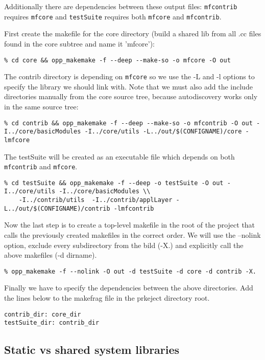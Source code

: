 Additionally there are dependencies between these output files: \texttt{mfcontrib}
requires \texttt{mfcore} and \texttt{testSuite} requires both \texttt{mfcore}
and \texttt{mfcontrib}.

First create the makefile for the core directory (build a shared lib from all .cc files
found in the core subtree and name it 'mfcore'):

\begin{verbatim}
% cd core && opp_makemake -f --deep --make-so -o mfcore -O out
\end{verbatim}

The contrib directory is depending on \texttt{mfcore} so we use the -L and -l options
to specify the library we should link with. Note that we must also add
the include directories manually from the core source tree, because autodiscovery works only
in the same source tree:
\begin{verbatim}
% cd contrib && opp_makemake -f --deep --make-so -o mfcontrib -O out -I../core/basicModules -I../core/utils -L../out/$(CONFIGNAME)/core -lmfcore
\end{verbatim}

The testSuite will be created as an executable file which depends on both
\texttt{mfcontrib} and \texttt{mfcore}.
\begin{verbatim}
% cd testSuite && opp_makemake -f --deep -o testSuite -O out -I../core/utils -I../core/basicModules \\
    -I../contrib/utils  -I../contrib/applLayer -L../out/$(CONFIGNAME)/contrib -lmfcontrib
\end{verbatim}

Now the last step is to create a top-level makefile in the root of the project that
calls the previously created makefiles in the correct order. We will use the
--nolink option, exclude every subdirectory from the bild (-X.) and explicitly call
the above makefiles (-d dirname).
\begin{verbatim}
% opp_makemake -f --nolink -O out -d testSuite -d core -d contrib -X.
\end{verbatim}

Finally we have to specify the dependencies between the above directories. Add the lines below to the makefrag file
in the prkeject directory root.
\begin{verbatim}
contrib_dir: core_dir
testSuite_dir: contrib_dir
\end{verbatim}

\subsection{Static vs shared {\opp} system libraries}

